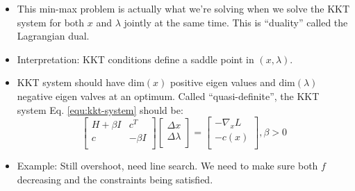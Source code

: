 \begin{itemize}
\begin{equation}
\begin{array}{c}
\begin{array}{l}
            0,x\le 0\\
            +\infty ,x>0\\
        \end{array} \right.\\
            \Rightarrow \min _x\max _{\lambda \ge 0}f\left( x \right) +\lambda ^Tc\left( x \right)\\
        \end{array}
    \end{equation}
    \item This min-max problem is actually what we're solving when we solve the KKT system for both $x$ and $\lambda$ jointly at the same time. This is ``duality'' called the Lagrangian dual. 
    \item Interpretation: KKT conditions define a saddle point in $(x,\lambda)$.
    \item KKT system should have $\text{dim}(x)$ positive eigen values and $\text{dim}(\lambda)$ negative eigen valves at an optimum. Called ``quasi-definite'', the KKT system Eq. \eqref{equ:kkt-system} should be:
    \begin{equation}
        \left[ \begin{matrix}
            H+\beta I&		c^T\\
            c&		-\beta I\\
        \end{matrix} \right] \left[ \begin{array}{c}
            \Delta x\\
            \Delta \lambda\\
        \end{array} \right] =\left[ \begin{array}{c}
            -\nabla _xL\\
            -c\left( x \right)\\
        \end{array} \right] ,\beta >0
    \end{equation}
    \item Example: Still overshoot, need line search. We need to make sure both $f$ decreasing and the constraints being satisfied.
\end{itemize}

